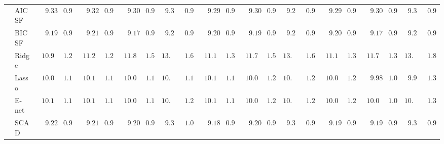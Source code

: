 \begin{tabular}{p{0.2cm}p{1cm}|p{0.6cm}p{0.6cm}|p{0.6cm}p{0.6cm}p{0.6cm}p{0.6cm}p{0.6cm}p{0.6cm}|p{0.6cm}p{0.6cm}p{0.6cm}p{0.6cm}p{0.6cm}p{0.6cm}|p{0.6cm}p{0.6cm}p{0.6cm}p{0.6cm}p{0.6cm}p{0.6cm}}
 & AIC SF  & $\phantom{00}9.33$ & $\phantom{0}0.97$ & $\phantom{00}9.32$ & $\phantom{0}0.98$ & $\phantom{00}9.30$ & $\phantom{0}0.96$ & $\phantom{0}9.33$ & $\phantom{0}0.98$ & $\phantom{00}9.29$ & $\phantom{0}0.96$ & $\phantom{00}9.30$ & $\phantom{0}0.97$ & $\phantom{0}9.29$ & $\phantom{0}0.97$ & $\phantom{00}9.29$ & $\phantom{0}0.96$ & $\phantom{00}9.30$ & $\phantom{0}0.95$ & $\phantom{0}9.30$ & $\phantom{0}0.96$ \\
 & BIC SF  & $\phantom{00}9.19$ & $\phantom{0}0.94$ & $\phantom{00}9.21$ & $\phantom{0}0.96$ & $\phantom{00}9.17$ & $\phantom{0}0.95$ & $\phantom{0}9.25$ & $\phantom{0}0.95$ & $\phantom{00}9.20$ & $\phantom{0}0.92$ & $\phantom{00}9.19$ & $\phantom{0}0.94$ & $\phantom{0}9.27$ & $\phantom{0}0.91$ & $\phantom{00}9.20$ & $\phantom{0}0.95$ & $\phantom{00}9.17$ & $\phantom{0}0.92$ & $\phantom{0}9.25$ & $\phantom{0}0.98$ \\
 & Ridge  & $\phantom{0}10.91$ & $\phantom{0}1.25$ & $\phantom{0}11.23$ & $\phantom{0}1.26$ & $\phantom{0}11.85$ & $\phantom{0}1.50$ & $13.72$ & $\phantom{0}1.65$ & $\phantom{0}11.13$ & $\phantom{0}1.31$ & $\phantom{0}11.77$ & $\phantom{0}1.55$ & $13.21$ & $\phantom{0}1.60$ & $\phantom{0}11.12$ & $\phantom{0}1.34$ & $\phantom{0}11.77$ & $\phantom{0}1.38$ & $13.66$ & $\phantom{0}1.84$ \\
 & Lasso  & $\phantom{0}10.09$ & $\phantom{0}1.18$ & $\phantom{0}10.17$ & $\phantom{0}1.14$ & $\phantom{0}10.06$ & $\phantom{0}1.13$ & $10.07$ & $\phantom{0}1.19$ & $\phantom{0}10.10$ & $\phantom{0}1.15$ & $\phantom{0}10.06$ & $\phantom{0}1.24$ & $10.07$ & $\phantom{0}1.22$ & $\phantom{0}10.01$ & $\phantom{0}1.24$ & $\phantom{00}9.98$ & $\phantom{0}1.09$ & $\phantom{0}9.99$ & $\phantom{0}1.31$ \\
 & E-net  & $\phantom{0}10.10$ & $\phantom{0}1.18$ & $\phantom{0}10.19$ & $\phantom{0}1.14$ & $\phantom{0}10.08$ & $\phantom{0}1.14$ & $10.06$ & $\phantom{0}1.20$ & $\phantom{0}10.10$ & $\phantom{0}1.15$ & $\phantom{0}10.08$ & $\phantom{0}1.25$ & $10.08$ & $\phantom{0}1.22$ & $\phantom{0}10.02$ & $\phantom{0}1.23$ & $\phantom{0}10.00$ & $\phantom{0}1.09$ & $10.01$ & $\phantom{0}1.32$ \\
 & SCAD  & $\phantom{00}9.22$ & $\phantom{0}0.94$ & $\phantom{00}9.21$ & $\phantom{0}0.97$ & $\phantom{00}9.20$ & $\phantom{0}0.95$ & $\phantom{0}9.33$ & $\phantom{0}1.00$ & $\phantom{00}9.18$ & $\phantom{0}0.93$ & $\phantom{00}9.20$ & $\phantom{0}0.93$ & $\phantom{0}9.35$ & $\phantom{0}0.94$ & $\phantom{00}9.19$ & $\phantom{0}0.92$ & $\phantom{00}9.19$ & $\phantom{0}0.94$ & $\phantom{0}9.33$ & $\phantom{0}0.98$ \\

\end{tabular}
